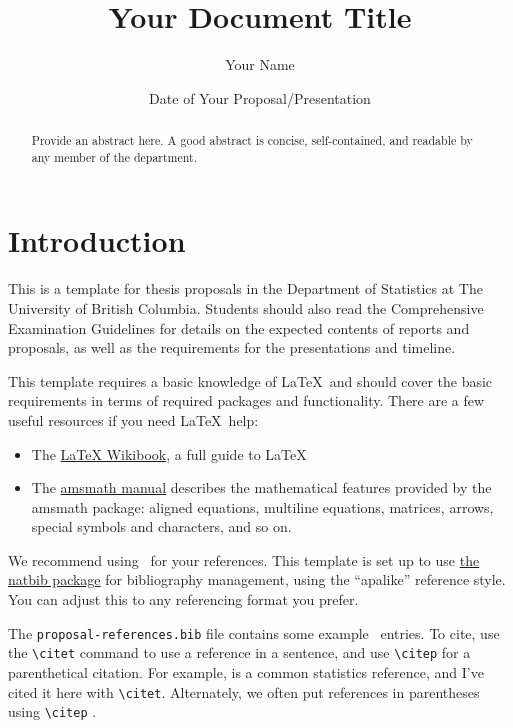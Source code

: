 \documentclass[draft]{ubcstatproposal} %
\title{Your Document Title}
\author{Your Name}
\date{Date of Your Proposal/Presentation}
\begin{document}
\maketitle


\begin{abstract}
  Provide an abstract here. A good abstract is concise, self-contained, and
  readable by any member of the department.
\end{abstract}

\section{Introduction}

This is a template for thesis proposals in the Department of Statistics at The
University of British Columbia. Students should also read the Comprehensive
Examination Guidelines for details on the expected contents of reports and
proposals, as well as the requirements for the presentations and timeline.

This template requires a basic knowledge of \LaTeX\ and should cover the basic
requirements in terms of required packages and functionality. There are a few
useful resources if you need \LaTeX\ help:
\begin{itemize}
\item The \href{https://en.wikibooks.org/wiki/LaTeX}{LaTeX Wikibook}, a full
  guide to \LaTeX
\item The
  \href{http://mirrors.ctan.org/macros/latex/required/amsmath/amsldoc.pdf}{amsmath
    manual} describes the mathematical features provided by the amsmath package:
  aligned equations, multiline equations, matrices, arrows, special symbols and
  characters, and so on.
\end{itemize}

We recommend using \BibTeX\ for your references. This template is set up to use
\href{http://mirrors.ctan.org/macros/latex/contrib/natbib/natbib.pdf}{the natbib
  package} for bibliography management, using the ``apalike'' reference style.
You can adjust this to any referencing format you prefer.

The \texttt{proposal-references.bib} file contains some example \BibTeX\ entries.
To cite, use the \verb|\citet| command to use a reference in a sentence, and use
\verb|\citep| for a parenthetical citation. For example, \citet{Wasserman:2004}
is a common statistics reference, and I've cited it here with \verb|\citet|.
Alternately, we often put references in parentheses using \verb|\citep|
\citep{Underhill:1999}.
\end{document}

